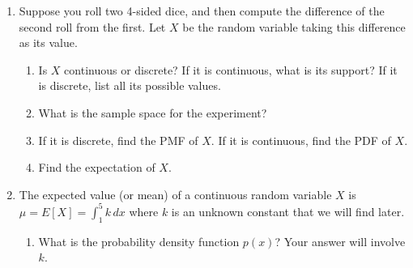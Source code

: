 \documentclass[11pt]{article}
\begin{document}
\begin{enumerate}
\begin{enumerate}
    \begin{enumerate}
        \item[(i)] $\displaystyle\sum_{i=4}^6\dfrac{2i}{i-3}$

        \vfill

        \item[(ii)] $\displaystyle\sum_{j=2}^54$ 

        \vfill
    \end{enumerate}

    \item Rewrite the following in summation notation. 

    \[e^2+3e^3+5e^4+7e^5\]

    \vfill
\end{enumerate}
\newpage
\item[\textbf{P1.}] Suppose you roll two 4-sided dice, and then compute the difference of the second roll from the first. Let \( X \) be the random variable taking this difference as its value.
    \begin{enumerate}

        \item Is \( X \) continuous or discrete? If it is continuous, what is its support? If it is discrete, list all its possible values.
            \vspace{3cm}

        \item What is the sample space for the experiment?
            \vspace{3cm}

        \item If it is discrete, find the PMF of \( X \).
        If it is continuous, find the PDF of $X$.
            \vspace{5cm}

        \item Find the expectation of \( X \).

    \end{enumerate}

    \pagebreak

\item[\textbf{P2.}] The expected value (or mean) of a continuous random variable $X$ is $\displaystyle \mu=E[X]=\int_1^5k \,dx$ where $k$ is an unknown constant that we will find later. 
    \begin{enumerate}

        \item What is the probability density function $p(x)$? Your answer will involve $k$.
            \vspace{3cm}


\end{enumerate}
\end{enumerate}
\end{document}

